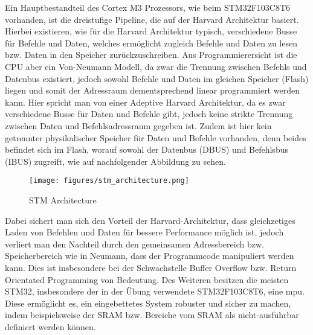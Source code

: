 \documentclass[a4paper,
DIV=13,
12pt,
BCOR=10mm,
department=FakIM,
oneside,
parskip=half,
automark,
listof=totocnumbered,
bibliography=totocnumbered,
acronym=totocnumbered
] {OTHRartcl}
\begin{document}
Ein Hauptbestandteil des Cortex M3 Prozessors, wie beim STM32F103C8T6 vorhanden, ist die dreistufige Pipeline, die auf der Harvard Architektur basiert.
Hierbei existieren, wie für die Harvard Architektur typisch, verschiedene Busse für Befehle und Daten, welches ermöglicht zugleich Befehle und Daten zu lesen bzw. Daten in den Speicher zurückzuschreiben.
Aus Programmierersicht ist die CPU aber ein Von-Neumann Modell, da zwar die Trennung zwischen Befehls und Datenbus existiert, jedoch sowohl Befehle und Daten im gleichen Speicher (Flash) liegen und
somit der Adressraum dementsprechend linear programmiert werden kann.
Hier spricht man von einer Adeptive Harvard Architektur, da es zwar verschiedene Busse für Daten und Befehle gibt, jedoch keine strikte Trennung zwischen Daten und Befehlsadressraum gegeben ist.
Zudem ist hier kein getrennter physikalischer Speicher für Daten und Befehle vorhanden, denn beides befindet sich im Flash, worauf sowohl der Datenbus (DBUS) und Befehlsbus (IBUS) zugreift, wie auf
nachfolgender Abbildung zu sehen.
\begin{figure}[ht!]
  \begin{center}
    \texttt{[image: figures/stm\_architecture.png]}
    \caption{STM Architecture}
    \label{Abbildung 1: STM Architecture}
  \end{center}
\end{figure}
Dabei sichert man sich den Vorteil der Harvard-Architektur, dass gleichzetiges Laden von Befehlen und Daten für bessere Performance möglich ist, jedoch
verliert man den Nachteil durch den gemeinsamen Adressbereich bzw. Speicherbereich wie in Neumann, dass der Programmcode manipuliert werden kann.
Dies ist insbesondere bei der Schwachstelle Buffer Overflow bzw. Return Orientated Programming von Bedeutung.
Des Weiteren besitzen die meisten STM32, insbesondere der in der Übung verwendete STM32F103C8T6, eine \ac{mpu}.
Diese ermöglicht es, ein eingebettetes System robuster und sicher zu machen, indem beispielsweise der SRAM bzw. Bereiche vom SRAM als nicht-ausführbar definiert werden können.
\end{document}
